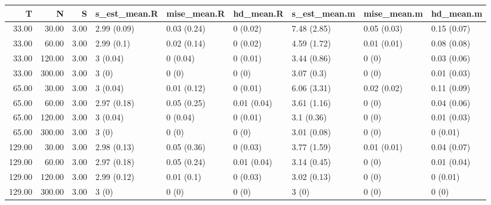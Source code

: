 \begin{table}[ht]
\centering
\begin{tabular}{rrrllllll}
  \hline
T & N & S & s\_est\_mean.R & mise\_mean.R & hd\_mean.R & s\_est\_mean.m & mise\_mean.m & hd\_mean.m \\ 
  \hline
33.00 & 30.00 & 3.00 & 2.99 (0.09) & 0.03 (0.24) & 0 (0.02) & 7.48 (2.85) & 0.05 (0.03) & 0.15 (0.07) \\ 
  33.00 & 60.00 & 3.00 & 2.99 (0.1) & 0.02 (0.14) & 0 (0.02) & 4.59 (1.72) & 0.01 (0.01) & 0.08 (0.08) \\ 
  33.00 & 120.00 & 3.00 & 3 (0.04) & 0 (0.04) & 0 (0.01) & 3.44 (0.86) & 0 (0) & 0.03 (0.06) \\ 
  33.00 & 300.00 & 3.00 & 3 (0) & 0 (0) & 0 (0) & 3.07 (0.3) & 0 (0) & 0.01 (0.03) \\ 
  65.00 & 30.00 & 3.00 & 3 (0.04) & 0.01 (0.12) & 0 (0.01) & 6.06 (3.31) & 0.02 (0.02) & 0.11 (0.09) \\ 
  65.00 & 60.00 & 3.00 & 2.97 (0.18) & 0.05 (0.25) & 0.01 (0.04) & 3.61 (1.16) & 0 (0) & 0.04 (0.06) \\ 
  65.00 & 120.00 & 3.00 & 3 (0.04) & 0 (0.04) & 0 (0.01) & 3.1 (0.36) & 0 (0) & 0.01 (0.03) \\ 
  65.00 & 300.00 & 3.00 & 3 (0) & 0 (0) & 0 (0) & 3.01 (0.08) & 0 (0) & 0 (0.01) \\ 
  129.00 & 30.00 & 3.00 & 2.98 (0.13) & 0.05 (0.36) & 0 (0.03) & 3.77 (1.59) & 0.01 (0.01) & 0.04 (0.07) \\ 
  129.00 & 60.00 & 3.00 & 2.97 (0.18) & 0.05 (0.24) & 0.01 (0.04) & 3.14 (0.45) & 0 (0) & 0.01 (0.04) \\ 
  129.00 & 120.00 & 3.00 & 2.99 (0.12) & 0.01 (0.1) & 0 (0.03) & 3.02 (0.13) & 0 (0) & 0 (0.01) \\ 
  129.00 & 300.00 & 3.00 & 3 (0) & 0 (0) & 0 (0) & 3 (0) & 0 (0) & 0 (0) \\ 
   \hline
\end{tabular}
\end{table}
